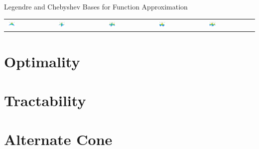 \documentclass[10pt,compress,xcolor={usenames,dvipsnames},aspectratio=169]{beamer}
\begin{document}
\begin{frame}{Legendre and Chebyshev Bases for Function Approximation}
\begin{tabular}{>{\centering}m{}>{\centering}m{}>{\centering}m{}>{\centering}m{}>{\centering}m{}}
\includegraphics[width =0.18\textwidth]{ProgramsImages/Chebyshev_Degree_1_1.png}  &
\includegraphics[width =0.18\textwidth]{ProgramsImages/Chebyshev_Degree_1_2.png}  &
\includegraphics[width =0.18\textwidth]{ProgramsImages/Chebyshev_Degree_1_3.png}  &
\includegraphics[width =0.18\textwidth]{ProgramsImages/Chebyshev_Degree_2_2.png}  &
\includegraphics[width =0.18\textwidth]{ProgramsImages/Chebyshev_Degree_2_3.png} 
	\end{tabular}
\end{frame}


\section{Optimality}


\section{Tractability}


\section{Alternate Cone}
\end{document}
